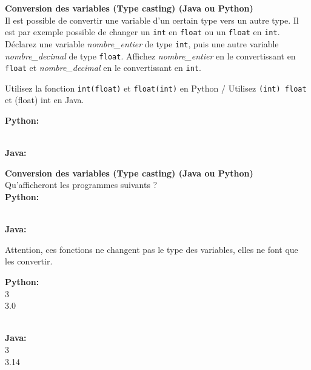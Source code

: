 \begin{Exercice}[5 minutes] \textbf{Conversion des variables (Type casting) (Java ou Python)}\\
   Il est possible de convertir une variable d'un certain type vers un autre type. Il est par exemple possible de changer un \lstinline{int} en \lstinline{float} ou un \lstinline{float} en \lstinline{int}. Déclarez une variable \textit{nombre\_entier} de type \lstinline{int}, puis une autre variable \textit{nombre\_decimal} de type \lstinline{float}. Affichez \textit{nombre\_entier} en le convertissant en \lstinline{float} et \textit{nombre\_decimal} en le convertissant en \lstinline{int}. \\
   
    \begin{conseil}
       Utilisez la fonction \lstinline{int(float)} et \lstinline{float(int)} en Python / Utilisez \lstinline{(int) float} et (float) int en Java.
        
    \end{conseil}
    \begin{solution}
    
    \textbf{Python:}
    
    
    
    \textbf{\\Java:}
    
           
    \end{solution}   
\end{Exercice}

\begin{Exercice}[5 minutes] \textbf{Conversion des variables (Type casting) (Java ou Python) \optionnel}\\
   Qu'afficheront les programmes suivants ? \\
   
   \textbf{Python:}
   
   
   \textbf{\\Java:}
   
    
   
    \begin{conseil}
      	Attention, ces fonctions ne changent pas le type des variables, elles ne font que les convertir.
        
    \end{conseil}
    \begin{solution}
     
    \textbf{Python:}\\
    3\\
    3.0
    
    \textbf{\\Java:}\\
    3\\
    3.14 \\
           
    \end{solution}   
\end{Exercice}


